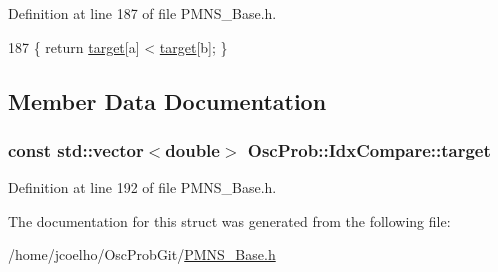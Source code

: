 Definition at line 187 of file P\+M\+N\+S\+\_\+\+Base.\+h.


\begin{DoxyCode}
187 \{ \textcolor{keywordflow}{return} \hyperlink{structOscProb_1_1IdxCompare_ab3258085f0afeb64bf472413bfed43ac}{target}[a] < \hyperlink{structOscProb_1_1IdxCompare_ab3258085f0afeb64bf472413bfed43ac}{target}[b]; \}
\end{DoxyCode}


\subsection{Member Data Documentation}
\subsubsection[{\texorpdfstring{target}{target}}]{\setlength{\rightskip}{0pt plus 5cm}const std\+::vector$<$double$>$ Osc\+Prob\+::\+Idx\+Compare\+::target\hspace{0.3cm}{\ttfamily [private]}}\hypertarget{structOscProb_1_1IdxCompare_ab3258085f0afeb64bf472413bfed43ac}{}\label{structOscProb_1_1IdxCompare_ab3258085f0afeb64bf472413bfed43ac}


Definition at line 192 of file P\+M\+N\+S\+\_\+\+Base.\+h.



The documentation for this struct was generated from the following file\+:\begin{DoxyCompactItemize}
\item 
/home/jcoelho/\+Osc\+Prob\+Git/\hyperlink{PMNS__Base_8h}{P\+M\+N\+S\+\_\+\+Base.\+h}\end{DoxyCompactItemize}
